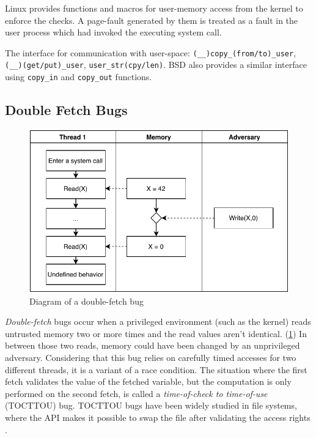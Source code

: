 Linux provides functions and macros for user-memory access from the kernel to 
enforce the checks. A page-fault generated by them is treated as a fault in the
user process which had invoked the executing system call.


The interface for communication with user-space: \texttt{(\_\_)copy\_(from/to)\_user},
\texttt{(\_\_)(get/put)\_user}, \texttt{user\_str(cpy/len)}.
BSD also provides a similar interface using \texttt{copy\_in} and 
\texttt{copy\_out} functions.

\subsection{Double Fetch Bugs}
\label{subsec:doublefetch}

\begin{figure}[]
  \centering
  \includegraphics[width=.85\linewidth]{img/doublefetch.pdf}
  \caption{Diagram of a double-fetch bug}
  \label{fig:doublefetch}
\end{figure}

\emph{Double-fetch} bugs occur when a privileged environment (such as the
kernel) reads untrusted memory two or more times and the read values aren't
identical. (\cref{fig:doublefetch}) In between those two reads, memory could
have been changed by an unprivileged adversary. Considering that this bug relies
on carefully timed accesses for two different threads, it is a variant of a race
condition. The situation where the first fetch validates the value of the
fetched variable, but the computation is only performed on the second fetch, is
called a \emph{time-of-check to time-of-use} (TOCTTOU) bug. TOCTTOU bugs have
been widely studied in file systems, where the API makes it possible to swap the
file after validating the access rights \cite{payer2012protecting,
pu2006methodical, wei2010modeling, tsafrir2008portably}.

